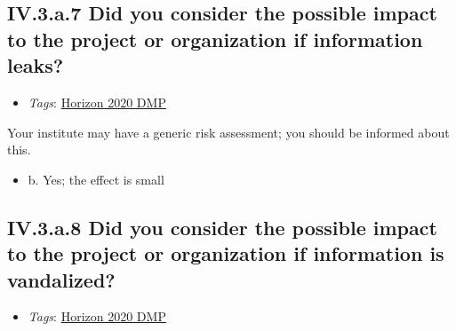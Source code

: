 \documentclass[a4paper,12pt]{report}
\begin{document}
\subsection*{\protect\textcolor{colorSecId}{IV.3.a.7} Did you consider the possible impact to the project or organization if information leaks?}

\label{10a10ffd-bfe1-4c6b-bbb6-3dfb1e63a5d5.614ab69d-55a6-4214-b384-00ba21ce92a1.b2f76c0a-847a-403c-9ed6-09cad10e625e.a20ddc5d-e883-4bc4-9948-36a2cb477d10}


\begin{itemize}
  \item \textit{Tags}: \ul{Horizon 2020 DMP}
  \end{itemize}


\noindent
\begin{markdown}
Your institute may have a generic risk assessment; you should be informed about this.
\end{markdown}



\begin{itemize}
  \item[\CheckmarkBold] b. Yes; the effect is small
\end{itemize}




\subsection*{\protect\textcolor{colorSecId}{IV.3.a.8} Did you consider the possible impact to the project or organization if information is vandalized?}

\label{10a10ffd-bfe1-4c6b-bbb6-3dfb1e63a5d5.614ab69d-55a6-4214-b384-00ba21ce92a1.b2f76c0a-847a-403c-9ed6-09cad10e625e.8cd49d8f-9af0-4ea9-985a-5d45142ac388}


\begin{itemize}
  \item \textit{Tags}: \ul{Horizon 2020 DMP}
  \end{itemize}
\end{document}

